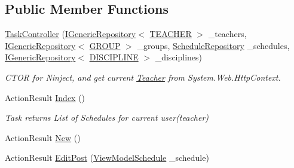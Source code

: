 \subsection*{Public Member Functions}
\begin{DoxyCompactItemize}
\item 
\hyperlink{class_in_study_asp_1_1_controllers_1_1_user_1_1_teacher_1_1_task_controller_aa263231cb68f3b2bf018d0bef50034f6}{Task\+Controller} (\hyperlink{interface_repo_1_1_common_1_1_i_generic_repository}{I\+Generic\+Repository}$<$ \hyperlink{class_e_f_oracle_1_1_model_1_1_t_e_a_c_h_e_r}{T\+E\+A\+C\+H\+ER} $>$ \+\_\+teachers, \hyperlink{interface_repo_1_1_common_1_1_i_generic_repository}{I\+Generic\+Repository}$<$ \hyperlink{class_e_f_oracle_1_1_model_1_1_g_r_o_u_p}{G\+R\+O\+UP} $>$ \+\_\+groups, \hyperlink{class_repo_1_1_schedule_repository}{Schedule\+Repository} \+\_\+schedules, \hyperlink{interface_repo_1_1_common_1_1_i_generic_repository}{I\+Generic\+Repository}$<$ \hyperlink{class_e_f_oracle_1_1_model_1_1_d_i_s_c_i_p_l_i_n_e}{D\+I\+S\+C\+I\+P\+L\+I\+NE} $>$ \+\_\+disciplines)
\begin{DoxyCompactList}\small\item\em C\+T\+OR for Ninject, and get current \hyperlink{namespace_in_study_asp_1_1_controllers_1_1_user_1_1_teacher}{Teacher} from System.\+Web.\+Http\+Context. \end{DoxyCompactList}\item 
Action\+Result \hyperlink{class_in_study_asp_1_1_controllers_1_1_user_1_1_teacher_1_1_task_controller_a88f346da5b2fda2a6499cd0decd19f3f}{Index} ()
\begin{DoxyCompactList}\small\item\em Task returns List of Schedules for current user(teacher) \end{DoxyCompactList}\item 
Action\+Result \hyperlink{class_in_study_asp_1_1_controllers_1_1_user_1_1_teacher_1_1_task_controller_ad6ce793aa9b6c80888605d79163bf48a}{New} ()
\begin{DoxyCompactList}\small\item\em \begin{DoxyVerb}\end{DoxyVerb}
 \end{DoxyCompactList}\item 
Action\+Result \hyperlink{class_in_study_asp_1_1_controllers_1_1_user_1_1_teacher_1_1_task_controller_a8d790822160cc184b71d58b1b20cd060}{Edit\+Post} (\hyperlink{class_in_study_asp_1_1_models_1_1_user_1_1_teacher_1_1_view_model_schedule}{View\+Model\+Schedule} \+\_\+schedule)

\end{DoxyCompactItemize}
